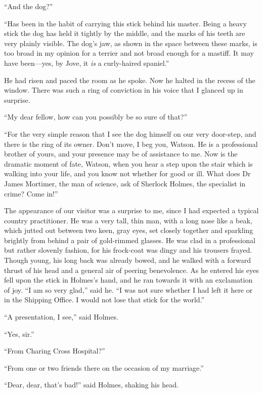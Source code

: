 \documentclass[paper=a5,BCOR=7mm,twoside,DIV=calc,12pt,usegeometry,openany,chapterprefix,endperiod,headings=big]{scrbook} %
\begin{document}
\enquote{And the dog?}

\enquote{Has been in the habit of carrying this stick behind his master. Being a heavy stick the dog has held it tightly by the middle, and the marks of his teeth are very plainly visible. The dog's jaw, as shown in the space between these marks, is too broad in my opinion for a terrier and not broad enough for a mastiff. It may have been---yes, by Jove, it \emph{is} a curly-haired spaniel.}

He had risen and paced the room as he spoke. Now he halted in the recess of the window. There was such a ring of conviction in his voice that I glanced up in surprise.

\enquote{My dear fellow, how can you possibly be so sure of that?}

\enquote{For the very simple reason that I see the dog himself on our very door-step, and there is the ring of its owner. Don't move, I beg you, Watson. He is a professional brother of yours, and your presence may be of assistance to me. Now is the dramatic moment of fate, Watson, when you hear a step upon the stair which is walking into your life, and you know not whether for good or ill. What does Dr James Mortimer, the man of science, ask of Sherlock Holmes, the specialist in crime? Come in!}

The appearance of our visitor was a surprise to me, since I had expected a typical country practitioner. He was a very tall, thin man, with a long nose like a beak, which jutted out between two keen, gray eyes, set closely together and sparkling brightly from behind a pair of gold-rimmed glasses. He was clad in a professional but rather slovenly fashion, for his frock-coat was dingy and his trousers frayed. Though young, his long back was already bowed, and he walked with a forward thrust of his head and a general air of peering benevolence. As he entered his eyes fell upon the stick in Holmes's hand, and he ran towards it with an exclamation of joy. \enquote{I am so very glad,} said he. \enquote{I was not sure whether I had left it here or in the Shipping Office. I would not lose that stick for the world.}

\enquote{A presentation, I see,} said Holmes.

\enquote{Yes, sir.}

\enquote{From Charing Cross Hospital?}

\enquote{From one or two friends there on the occasion of my marriage.}

\enquote{Dear, dear, that's bad!} said Holmes, shaking his head.
\end{document}
